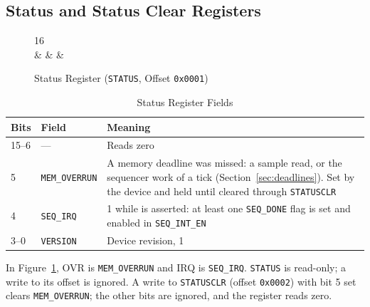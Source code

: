 \subsection{Status and Status Clear Registers}
\label{sec:reg-status}

\begin{figure}[H]
	\centering
	\begin{bytefield}[bitwidth=2em]{16}
		 \\
		 &
		 &
		 &
	\end{bytefield}
	\caption{Status Register (\texttt{STATUS}, Offset \texttt{0x0001})}
	\label{fig:reg-status}
\end{figure}

\begin{table}[H]
	\centering
	\begin{tabular}{llp{8.0cm}}
		\toprule
		\textbf{Bits} & \textbf{Field}        & \textbf{Meaning}                                                                                                                                                                \\
		\midrule
		15--6         & ---                   & Reads zero                                                                                                                                                                      \\
		5             & \texttt{MEM\_OVERRUN} & A memory deadline was missed: a sample read, or the sequencer work of a tick (Section~\ref{sec:deadlines}). Set by the device and held until cleared through \texttt{STATUSCLR} \\
		4             & \texttt{SEQ\_IRQ}     & 1 while \activelow{IRQ3} is asserted: at least one \texttt{SEQ\_DONE} flag is set and enabled in \texttt{SEQ\_INT\_EN}                                                          \\
		3--0          & \texttt{VERSION}      & Device revision, 1                                                                                                                                                              \\
		\bottomrule
	\end{tabular}
	\caption{Status Register Fields}
	\label{tab:reg-status-fields}
\end{table}

In Figure~\ref{fig:reg-status}, OVR is \texttt{MEM\_OVERRUN} and IRQ is \texttt{SEQ\_IRQ}. \texttt{STATUS} is
read-only; a write to its offset is ignored. A write to \texttt{STATUSCLR} (offset \texttt{0x0002}) with bit 5 set
clears \texttt{MEM\_OVERRUN}; the other bits are ignored, and the register reads zero.

